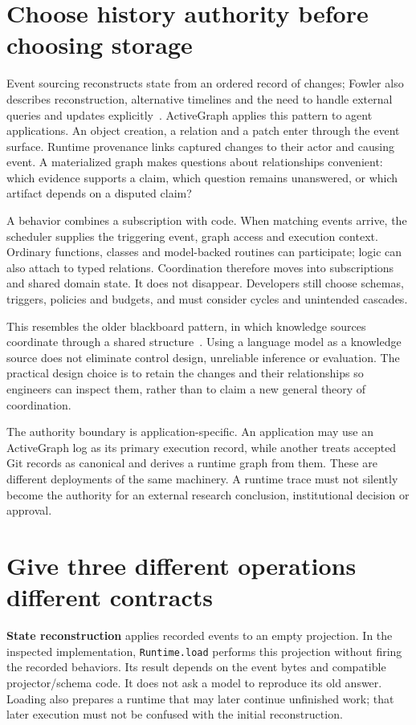\documentclass[11pt]{article}
\begin{document}
\section*{Choose history authority before choosing storage}
Event sourcing reconstructs state from an ordered record of changes; Fowler also describes reconstruction, alternative timelines and the need to handle external queries and updates explicitly~\cite{fowler}. ActiveGraph applies this pattern to agent applications. An object creation, a relation and a patch enter through the event surface. Runtime provenance links captured changes to their actor and causing event. A materialized graph makes questions about relationships convenient: which evidence supports a claim, which question remains unanswered, or which artifact depends on a disputed claim?

A behavior combines a subscription with code. When matching events arrive, the scheduler supplies the triggering event, graph access and execution context. Ordinary functions, classes and model-backed routines can participate; logic can also attach to typed relations. Coordination therefore moves into subscriptions and shared domain state. It does not disappear. Developers still choose schemas, triggers, policies and budgets, and must consider cycles and unintended cascades.

This resembles the older blackboard pattern, in which knowledge sources coordinate through a shared structure~\cite{nii}. Using a language model as a knowledge source does not eliminate control design, unreliable inference or evaluation. The practical design choice is to retain the changes and their relationships so engineers can inspect them, rather than to claim a new general theory of coordination.

The authority boundary is application-specific. An application may use an ActiveGraph log as its primary execution record, while another treats accepted Git records as canonical and derives a runtime graph from them. These are different deployments of the same machinery. A runtime trace must not silently become the authority for an external research conclusion, institutional decision or approval.

\section*{Give three different operations different contracts}
\textbf{State reconstruction} applies recorded events to an empty projection. In the inspected implementation, \texttt{Runtime.load} performs this projection without firing the recorded behaviors. Its result depends on the event bytes and compatible projector/schema code. It does not ask a model to reproduce its old answer. Loading also prepares a runtime that may later continue unfinished work; that later execution must not be confused with the initial reconstruction.
\end{document}
